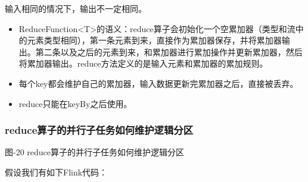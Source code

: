 \begin{Shaded}
\begin{Highlighting}[]
\OperatorTok{=} \OperatorTok{;}    
\OperatorTok{(}\OperatorTok{)} \OperatorTok{\{}
\OperatorTok{+=}\OperatorTok{;}
  \OperatorTok{;}
\OperatorTok{\}}

\OperatorTok{(}\OperatorTok{);} 
\OperatorTok{(}\OperatorTok{);} 
\OperatorTok{(}\OperatorTok{);} 
\end{Highlighting}
\end{Shaded}

输入相同的情况下，输出不一定相同。

\begin{itemize}
\tightlist
\item
  ReduceFunction\textless T\textgreater 的语义：reduce算子会初始化一个空累加器（类型和流中的元素类型相同），第一条元素到来，直接作为累加器保存，并将累加器输出。第二条以及之后的元素到来，和累加器进行累加操作并更新累加器，然后将累加器输出。reduce方法定义的是输入元素和累加器的累加规则。
\item
  每个key都会维护自己的累加器，输入数据更新完累加器之后，直接被丢弃。
\item
  reduce只能在keyBy之后使用。
\end{itemize}

\hypertarget{reduceux7b97ux5b50ux7684ux5e76ux884cux5b50ux4efbux52a1ux5982ux4f55ux7ef4ux62a4ux903bux8f91ux5206ux533a}{%
\subsubsection{reduce算子的并行子任务如何维护逻辑分区}\label{reduceux7b97ux5b50ux7684ux5e76ux884cux5b50ux4efbux52a1ux5982ux4f55ux7ef4ux62a4ux903bux8f91ux5206ux533a}}

图-20 reduce算子的并行子任务如何维护逻辑分区

假设我们有如下Flink代码：

